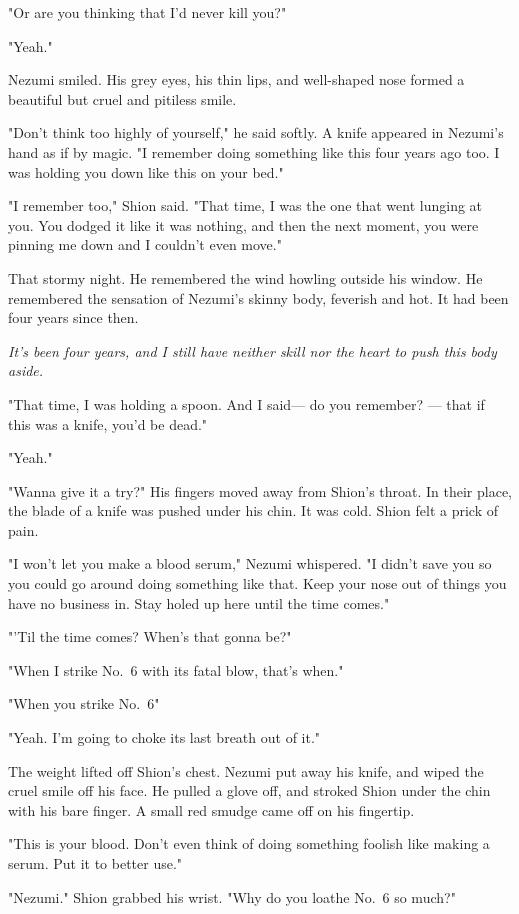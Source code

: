 "Or are you thinking that I'd never kill you?"

"Yeah."

Nezumi smiled. His grey eyes, his thin lips, and well-shaped nose formed
a beautiful but cruel and pitiless smile.

"Don't think too highly of yourself," he said softly. A knife appeared
in Nezumi's hand as if by magic. "I remember doing something like this
four years ago too. I was holding you down like this on your bed."

"I remember too," Shion said. "That time, I was the one that went
lunging at you. You dodged it like it was nothing, and then the next
moment, you were pinning me down and I couldn't even move."

That stormy night. He remembered the wind howling outside his window. He
remembered the sensation of Nezumi's skinny body, feverish and hot. It
had been four years since then.

\emph{It's been four years, and I still have neither skill nor the heart to
push this body aside.}

"That time, I was holding a spoon. And I said--- do you remember? --- that
if this was a knife, you'd be dead."

"Yeah."

"Wanna give it a try?" His fingers moved away from Shion's throat. In
their place, the blade of a knife was pushed under his chin. It was
cold. Shion felt a prick of pain.

"I won't let you make a blood serum," Nezumi whispered. "I didn't save
you so you could go around doing something like that. Keep your nose out
of things you have no business in. Stay holed up here until the time
comes."

"'Til the time comes? When's that gonna be?"

"When I strike No.~6 with its fatal blow, that's when."

"When you strike No.~6\el "

"Yeah. I'm going to choke its last breath out of it."

The weight lifted off Shion's chest. Nezumi put away his knife, and
wiped the cruel smile off his face. He pulled a glove off, and stroked
Shion under the chin with his bare finger. A small red smudge came off
on his fingertip.

"This is your blood. Don't even think of doing something foolish like
making a serum. Put it to better use."

"Nezumi." Shion grabbed his wrist. "Why do you loathe No.~6 so much?"

